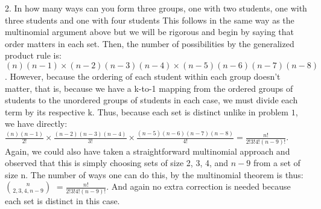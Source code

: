 \documentclass[12pt]{article}
\begin{document}
2. In how many ways can you form three groups, one with two students, one with three
students and one with four students 
\newline
\newline
This follows in the same way as the multinomial argument above but we will be rigorous and
begin by saying that order matters in each set. Then, the number of possibilities by the generalized product rule is:
\newline
$(n)(n-1) \times (n-2)(n-3)(n-4) \times (n-5)(n-6)(n-7)(n-8)$.
\newline
However, because the ordering of each student within each group doesn't matter,
that is, because we have a k-to-1 mapping from the ordered groups of students to the unordered
groups of students in each case, we must divide each term by its respective k. Thus, because 
each set is distinct unlike in problem $1$, we have directly:
\newline
\newline
$\frac{(n)(n-1)}{2!}\times\frac{(n-2)(n-3)(n-4)}{3!}\times\frac{(n-5)(n-6)(n-7)(n-8)}{4!} = \frac{n!}{2!3!4!(n-9)!}$.
\newline
\newline
Again, we could also have taken a straightforward multinomial approach and observed that
this is simply choosing sets of size 2, 3, 4, and $n-9$ from a set of size n. The number 
of ways one can do this, by the multinomial theorem is thus:
\newline
\newline
$n \choose {2, 3, 4, n-9}$ $ = \frac{n!}{2!3!4!(n-9)!}$.
\newline
\newline
And again no extra correction is needed because each set is distinct in this case.
\end{document}
